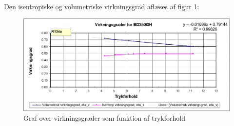 \documentclass[Hovedrapport.tex]{subfiles}
\begin{document}
Den isentropiske og volumetriske virkningsgrad aflæses af figur \ref{fig:kompressor_excel_3}:
\begin{figure}[H]
    \centering
    \includegraphics[width=1.0\textwidth]{Billeder/kompressor_excel_3}
    \caption{Graf over virkningsgrader som funktion af trykforhold}
    \label{fig:kompressor_excel_3}
\end{figure}
\newpage

\end{document}
